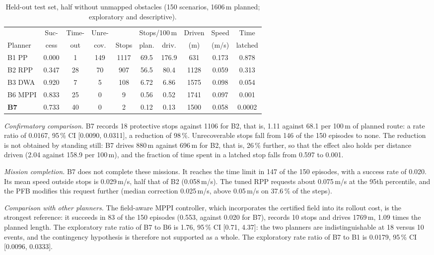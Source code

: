 \documentclass[conference]{IEEEtran}
\begin{document}
\begin{table}[t]
\centering
\caption{Held-out test set, half without unmapped obstacles (150 scenarios, 1606\,m planned; exploratory and descriptive).}
\label{tab:clear}
\footnotesize
\setlength{\tabcolsep}{2.2pt}
\begin{tabular}{lccccccccc}
\toprule
 & Suc- & Time- & Unre- & & \multicolumn{2}{c}{Stops/100\,m} & Driven & Speed & Time \\
Planner & cess & out & cov. & Stops & plan. & driv. & (m) & (m/s) & latched \\
\midrule
B1 PP & 0.000 & 1 & 149 & 1117 & 69.5 & 176.9 & 631 & 0.173 & 0.878 \\
B2 RPP & 0.347 & 28 & 70 & 907 & 56.5 & 80.4 & 1128 & 0.059 & 0.313 \\
B3 DWA & 0.920 & 7 & 5 & 108 & 6.72 & 6.86 & 1575 & 0.098 & 0.054 \\
B6 MPPI & 0.833 & 25 & 0 & 9 & 0.56 & 0.52 & 1741 & 0.097 & 0.001 \\
\textbf{B7} & 0.733 & 40 & 0 & 2 & 0.12 & 0.13 & 1500 & 0.058 & 0.0002 \\
\bottomrule
\end{tabular}
\end{table}

\emph{Confirmatory comparison.} B7 records 18 protective stops against 1106 for B2, that is, 1.11 against
68.1 per 100\,m of planned route: a rate ratio of 0.0167, 95\,\% CI [0.0090, 0.0311], a reduction of
98\,\%. Unrecoverable stops fall from 146 of the 150 episodes to none. The reduction is not obtained by
standing still: B7 drives 880\,m against 696\,m for B2, that is, 26\,\% further, so that the effect also
holds per distance driven (2.04 against 158.9 per 100\,m), and the fraction of time spent in a latched stop
falls from 0.597 to 0.001.

\emph{Mission completion.} B7 does not complete these missions. It reaches the time limit in 147 of the
150 episodes, with a success rate of 0.020. Its mean speed outside stops is 0.029\,m/s, half that of B2
(0.058\,m/s). The tuned RPP
requests about 0.075\,m/s at the 95th percentile, and the PFB modifies this request further (median
correction 0.025\,m/s, above 0.05\,m/s on 37.6\,\% of the steps).

\emph{Comparison with other planners.} The field-aware MPPI controller, which incorporates the certified
field into its rollout cost, is the strongest reference: it succeeds in 83 of the 150 episodes (0.553, against
0.020 for B7), records 10 stops and drives 1769\,m, 1.09 times the planned length. The exploratory rate ratio
of B7 to B6 is 1.76, 95\,\% CI [0.71, 4.37]: the two planners are indistinguishable at 18 versus 10 events,
and the contingency hypothesis is therefore not supported as a whole. The exploratory rate ratio of B7 to B1
is 0.0179, 95\,\% CI [0.0096, 0.0333].
\end{document}
